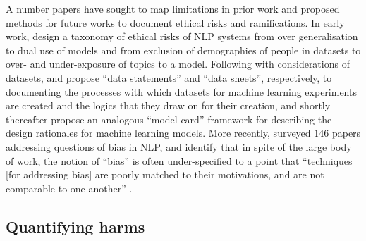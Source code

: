 A number papers have sought to map limitations in prior work and proposed methods for future works to document ethical risks and ramifications.
In early work, \citet{Hovy-Spruit:2016} design a taxonomy of ethical risks of NLP systems from over generalisation to dual use of models and from exclusion of demographies of people in datasets to over- and under-exposure of topics to a model.
Following with considerations of datasets, \citet{Bender-Friedman:2018} and \citet{Gebru:2018} propose ``data statements'' and ``data sheets'', respectively, to documenting the processes with which datasets for machine learning experiments are created and the logics that they draw on for their creation, and shortly thereafter \citet{Mitchell:2019} propose an analogous ``model card'' framework for describing the design rationales for machine learning models.
More recently, \citet{Blodgett:2020} surveyed $146$ papers addressing questions of bias in NLP, and identify that in spite of the large body of work, the notion of ``bias'' is often under-specified to a point that ``techniques [for addressing bias] are poorly matched to their motivations, and are not comparable to one another'' \citep[p. 5455]{Blodgett:2020}.

\subsection{Quantifying harms}


